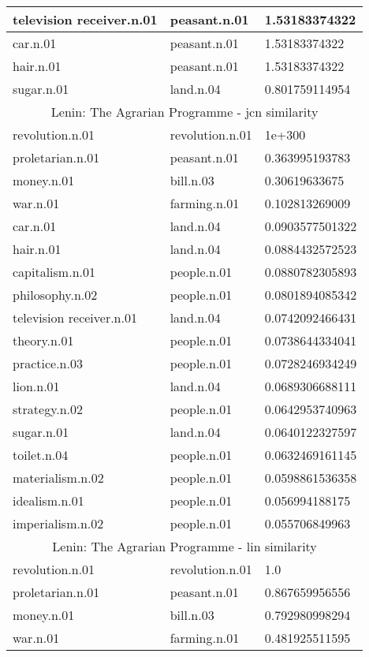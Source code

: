 \begin{center}
\begin{tabular}{ | l | l | l |}
television receiver.n.01 & peasant.n.01 & 1.53183374322\\ \hline
car.n.01 & peasant.n.01 & 1.53183374322\\ \hline
hair.n.01 & peasant.n.01 & 1.53183374322\\ \hline
sugar.n.01 & land.n.04 & 0.801759114954\\ \hline
\multicolumn{3}{|c|}{Lenin: The Agrarian Programme  - jcn similarity} \\ \hline
revolution.n.01 & revolution.n.01 & 1e+300\\ \hline
proletarian.n.01 & peasant.n.01 & 0.363995193783\\ \hline
money.n.01 & bill.n.03 & 0.30619633675\\ \hline
war.n.01 & farming.n.01 & 0.102813269009\\ \hline
car.n.01 & land.n.04 & 0.0903577501322\\ \hline
hair.n.01 & land.n.04 & 0.0884432572523\\ \hline
capitalism.n.01 & people.n.01 & 0.0880782305893\\ \hline
philosophy.n.02 & people.n.01 & 0.0801894085342\\ \hline
television receiver.n.01 & land.n.04 & 0.0742092466431\\ \hline
theory.n.01 & people.n.01 & 0.0738644334041\\ \hline
practice.n.03 & people.n.01 & 0.0728246934249\\ \hline
lion.n.01 & land.n.04 & 0.0689306688111\\ \hline
strategy.n.02 & people.n.01 & 0.0642953740963\\ \hline
sugar.n.01 & land.n.04 & 0.0640122327597\\ \hline
toilet.n.04 & people.n.01 & 0.0632469161145\\ \hline
materialism.n.02 & people.n.01 & 0.0598861536358\\ \hline
idealism.n.01 & people.n.01 & 0.056994188175\\ \hline
imperialism.n.02 & people.n.01 & 0.055706849963\\ \hline
\multicolumn{3}{|c|}{Lenin: The Agrarian Programme  - lin similarity} \\ \hline
revolution.n.01 & revolution.n.01 & 1.0\\ \hline
proletarian.n.01 & peasant.n.01 & 0.867659956556\\ \hline
money.n.01 & bill.n.03 & 0.792980998294\\ \hline
war.n.01 & farming.n.01 & 0.481925511595\\ \hline

\end{tabular}
\end{center}
